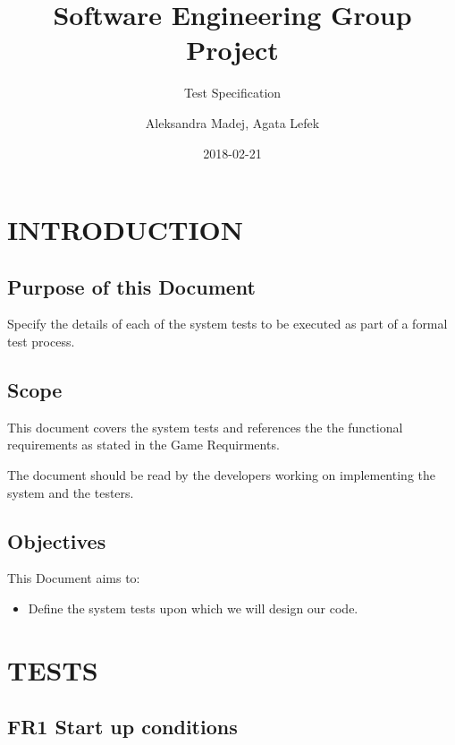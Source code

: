 \documentclass{project}
\begin{document}
\title{Software Engineering Group Project}
\subtitle{Test Specification}
\author{Aleksandra Madej, Agata Lefek}     
\date{2018-02-21}
\maketitle
\tableofcontents
\newpage

\section{INTRODUCTION}

\subsection{Purpose of this Document}

Specify the details of each of the system tests to be executed as part of a formal test process.

\subsection{Scope}

This document covers the system tests and references the the functional requirements as stated in the Game Requirments\cite{SE.QA.CSRS}.


The document should be read by the developers working on implementing the system and the testers.

\subsection{Objectives}

This Document aims to:

\begin{itemize}
\item Define the system tests upon which we will design our code.
\end{itemize}


\section{TESTS}

\subsection{FR1 Start up conditions}
\end{document}
